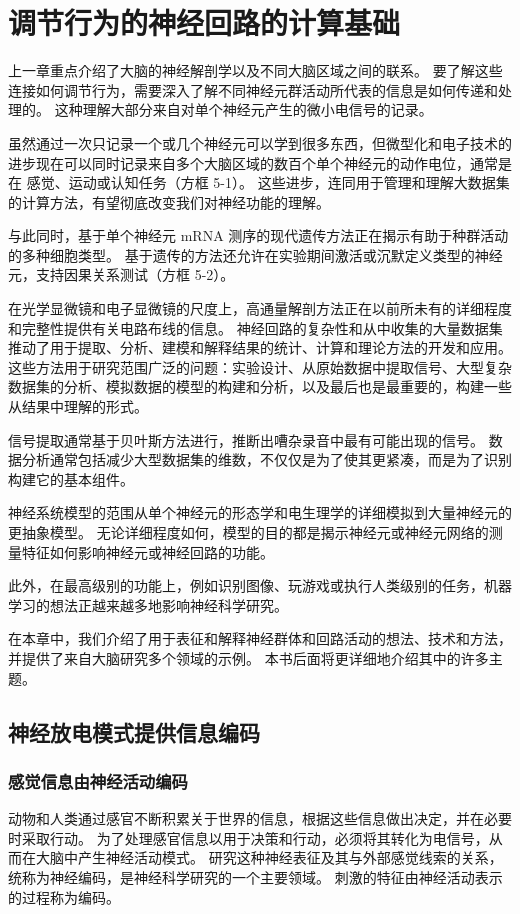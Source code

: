 \chapter{调节行为的神经回路的计算基础}
上一章重点介绍了大脑的神经解剖学以及不同大脑区域之间的联系。 要了解这些连接如何调节行为，需要深入了解不同神经元群活动所代表的信息是如何传递和处理的。 这种理解大部分来自对单个神经元产生的微小电信号的记录。

虽然通过一次只记录一个或几个神经元可以学到很多东西，但微型化和电子技术的进步现在可以同时记录来自多个大脑区域的数百个单个神经元的动作电位，通常是在 感觉、运动或认知任务（方框 5-1）。 这些进步，连同用于管理和理解大数据集的计算方法，有望彻底改变我们对神经功能的理解。

与此同时，基于单个神经元 mRNA 测序的现代遗传方法正在揭示有助于种群活动的多种细胞类型。 基于遗传的方法还允许在实验期间激活或沉默定义类型的神经元，支持因果关系测试（方框 5-2）。

在光学显微镜和电子显微镜的尺度上，高通量解剖方法正在以前所未有的详细程度和完整性提供有关电路布线的信息。 神经回路的复杂性和从中收集的大量数据集推动了用于提取、分析、建模和解释结果的统计、计算和理论方法的开发和应用。 这些方法用于研究范围广泛的问题：实验设计、从原始数据中提取信号、大型复杂数据集的分析、模拟数据的模型的构建和分析，以及最后也是最重要的，构建一些 从结果中理解的形式。

信号提取通常基于贝叶斯方法进行，推断出嘈杂录音中最有可能出现的信号。 数据分析通常包括减少大型数据集的维数，不仅仅是为了使其更紧凑，而是为了识别构建它的基本组件。

神经系统模型的范围从单个神经元的形态学和电生理学的详细模拟到大量神经元的更抽象模型。 无论详细程度如何，模型的目的都是揭示神经元或神经元网络的测量特征如何影响神经元或神经回路的功能。

此外，在最高级别的功能上，例如识别图像、玩游戏或执行人类级别的任务，机器学习的想法正越来越多地影响神经科学研究。

在本章中，我们介绍了用于表征和解释神经群体和回路活动的想法、技术和方法，并提供了来自大脑研究多个领域的示例。 本书后面将更详细地介绍其中的许多主题。

\section{神经放电模式提供信息编码}

\subsection{感觉信息由神经活动编码}
动物和人类通过感官不断积累关于世界的信息，根据这些信息做出决定，并在必要时采取行动。 为了处理感官信息以用于决策和行动，必须将其转化为电信号，从而在大脑中产生神经活动模式。 研究这种神经表征及其与外部感觉线索的关系，统称为神经编码，是神经科学研究的一个主要领域。 刺激的特征由神经活动表示的过程称为编码。

